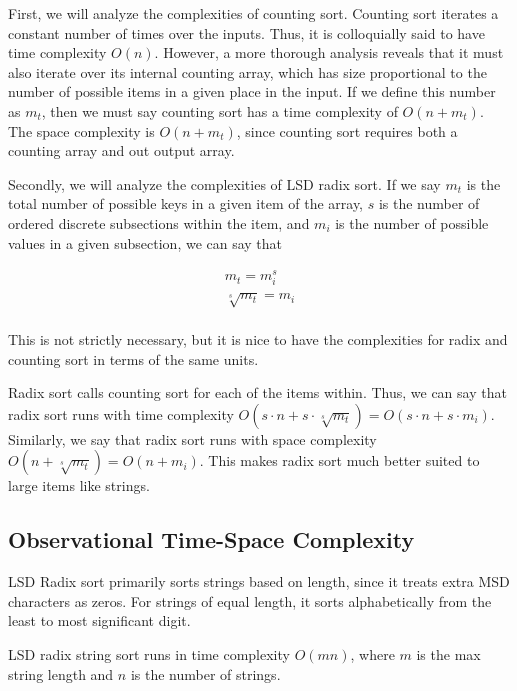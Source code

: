 \documentclass[12pt]{amsart}
\begin{document}
    First, we will analyze the complexities of counting sort.
    Counting sort iterates a constant number of times over the
    inputs. Thus, it is colloquially said to have time
    complexity $O(n)$. However, a more thorough analysis reveals
    that it must also iterate over its internal counting array,
    which has size proportional to the number of possible items
    in a given place in the input. If we define this number as
    $m_t$, then we must say counting sort has a time complexity of
    $O(n + m_t)$. The space complexity is $O(n + m_t)$, since
    counting sort requires both a counting array and out output
    array.

    Secondly, we will analyze the complexities of LSD radix
    sort. If we say $m_t$ is the total number of possible keys
    in a given item of the array, $s$ is the number of ordered
    discrete subsections within the item, and $m_i$ is the
    number of possible values in a given subsection, we can say
    that

    \[
    \begin{aligned}
        m_t = m_i^s            \\
        \sqrt[s]{m_t} = m_i    \\
    \end{aligned}
    \]

    This is not strictly necessary, but it is nice to have the
    complexities for radix and counting sort in terms of the
    same units.

    Radix sort calls counting sort for each of the items
    within. Thus, we can say that radix sort runs with time complexity
    $O(s \cdot n + s \cdot \sqrt[s]{m_t}) = O(s \cdot n + s \cdot m_i)$.
    Similarly, we say that radix sort runs with space complexity
    $O(n + \sqrt[s]{m_t}) = O(n + m_i)$. This makes radix sort
    much better suited to large items like strings.

    \subsection{Observational Time-Space Complexity}

    LSD Radix sort primarily sorts strings based on length,
    since it treats extra MSD characters as zeros. For strings
    of equal length, it sorts alphabetically from the least to
    most significant digit.

    LSD radix string sort runs in time complexity $O(mn)$, where
    $m$ is the max string length and $n$ is the number of
    strings.
\end{document}
